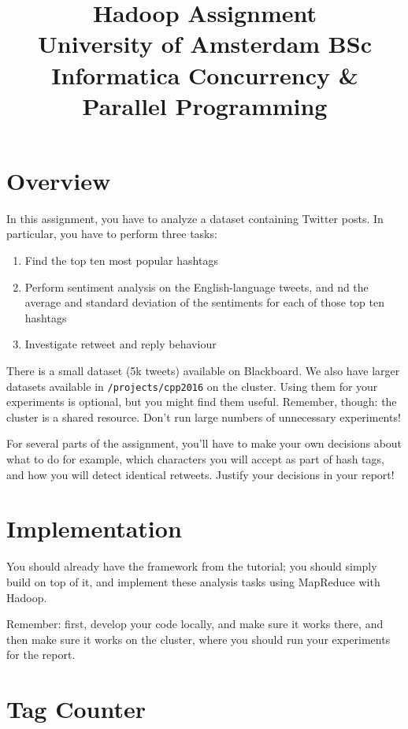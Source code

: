 \documentclass[a4paper,10pt]{article}
\date{}
\title{Hadoop Assignment\\
  University of Amsterdam BSc Informatica
  Concurrency \& Parallel Programming
}
\def \year {2016}
\begin{document}
  \maketitle
  
  \tableofcontents
  
  \section{Overview}
  
  In this assignment, you have to analyze a dataset containing Twitter posts. In particular, you have to
  perform three tasks:
  
  \begin{enumerate}
    \item Find the top ten most popular hashtags
    \item Perform sentiment analysis on the English-language tweets, and nd the average and standard deviation of the sentiments for each of those top ten hashtags
    \item Investigate retweet and reply behaviour
  \end{enumerate}
  
  There is a small dataset (5k tweets) available on Blackboard. We also have larger datasets available in \texttt{/projects/cpp\year} on the cluster. Using them for your experiments is optional, but you might find them useful. Remember, though: the cluster is a shared resource. Don't run large numbers of unnecessary experiments!
  
  For several parts of the assignment, you'll have to make your own decisions about what to do for example, which characters you will accept as part of hash tags, and how you will detect identical retweets. Justify your decisions in your report! 
  
  
  \section{Implementation}
  You should already have the framework from the tutorial; you should simply build on top of it, and implement these analysis tasks using MapReduce with Hadoop. 
  
  Remember: first, develop your code locally, and make sure it works there, and then make sure it works on the cluster, where you should run your experiments for the report.
  
  
  \section{Tag Counter}
  
\end{document}
